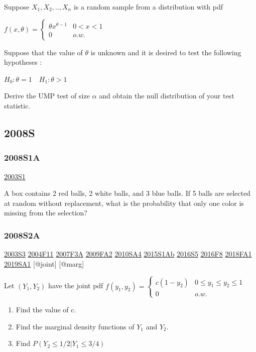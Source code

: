 \documentclass[6pt,Portrait]{article}
\begin{document}
Suppose \(X_1,X_2,..,X_n\) is a random sample from a distribution with
pdf

\(f(x,\theta)=\begin{cases}\theta x^{\theta-1}& 0<x<1\\0& o.w.\end{cases}\)

Suppose that the value of \(\theta\) is unknown and it is desired to
test the following hypotheses :

\(H_0:\theta=1\quad H_1 :\theta>1\)

Derive the UMP test of size \(\alpha\) and obtain the null distribution
of your test statistic.

\hypertarget{s-2}{%
\subsection{2008S}\label{s-2}}

\hypertarget{s1a}{%
\subsubsection{2008S1A}\label{s1a}}

\protect\hyperlink{s1}{2003S1}

A box contains 2 red balls, 2 white balls, and 3 blue balls. If 5 balls
are selected at random without replacement, what is the probability that
only one color is missing from the selection?

\hypertarget{s2a}{%
\subsubsection{2008S2A}\label{s2a}}

\protect\hyperlink{s3}{2003S3} \protect\hyperlink{f11}{2004F11}
\protect\hyperlink{f3a}{2007F3A} \protect\hyperlink{fa2}{2009FA2}
\protect\hyperlink{sa4-1}{2010SA4} \protect\hyperlink{s1ab}{2015S1Ab}
\protect\hyperlink{s5-4}{2016S5} \protect\hyperlink{f8-4}{2016F8}
\protect\hyperlink{fa1-4}{2018FA1} \protect\hyperlink{sa1-3}{2019SA1}
{[}@joint{]} {[}@marg{]}

Let \((Y_1,Y_2)\) have the joint pdf
\(f(y_1,y_2)=\begin{cases}c(1-y_2)&0\le y_1\le y_2\le 1\\0& o.w.\end{cases}\)

\begin{enumerate}
\def\labelenumi{(\alph{enumi})}
\item
  Find the value of c.
\item
  Find the marginal density functions of \(Y_1\) and \(Y_2\).
\item
  Find \(P(Y_2\le1/2|Y_1\le3/4)\)
\end{enumerate}
\end{document}
